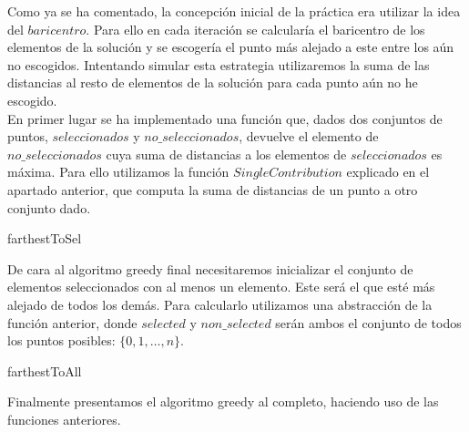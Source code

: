 \documentclass[11pt,a4paper]{article}
\begin{document}
	Como ya se ha comentado, la concepción inicial de la práctica era utilizar la idea del $baricentro$. Para ello en cada iteración se calcularía el baricentro de los elementos de la solución y se escogería el punto más alejado a este entre los aún no escogidos. Intentando simular esta estrategia utilizaremos la suma de las distancias al resto de elementos de la solución para cada punto aún no he escogido. \\
	
	En primer lugar se ha implementado una función que, dados dos conjuntos de puntos, $seleccionados$ y $no\_seleccionados$, devuelve el elemento de $no\_seleccionados$ cuya suma de distancias a los elementos de $seleccionados$ es máxima. Para ello utilizamos la función $SingleContribution$ explicado en el apartado anterior, que computa la suma de distancias de un punto a otro conjunto dado. \\ 

	\begin{algorithm}[H]
		\caption{farthestToSel}
	\end{algorithm}
	
	De cara al algoritmo greedy final necesitaremos inicializar el conjunto de elementos seleccionados con al menos un elemento. Este será el que esté más alejado de todos los demás. Para calcularlo utilizamos una abstracción de la función anterior, donde $selected$ y $non\_selected$ serán ambos el conjunto de todos los puntos posibles: $\{0,1,\dotsc, n\}$. \\
	
	\begin{algorithm}[H]
		\caption{farthestToAll}
	\end{algorithm}

	Finalmente presentamos el algoritmo greedy al completo, haciendo uso de las funciones anteriores. \\
\end{document}
